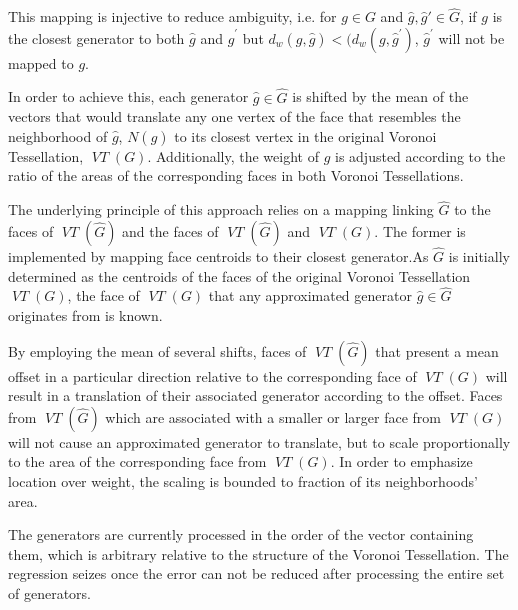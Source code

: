 \documentclass[a4paper]{article}
\DeclareMathOperator*{\VT}{\textit{VT}}
\begin{document}
This mapping is injective to reduce
ambiguity, i.e. for \(g \in G\) and \(\hat{g}, \hat{g}' \in \hat{G}\), if \(g\) is the closest generator to both
\(\hat{g}\) and \(\hat{g}^\prime\) but \(d_w(g, \hat{g}) < (d_w(g, \hat{g}^\prime)\), \(\hat{g}^\prime\) 
will not be mapped to \(g\).

In order to achieve this, each generator \(\hat{g} \in \hat{G}\) is shifted by the mean of the vectors that would translate
any one vertex of the face that resembles the neighborhood of \(\hat{g}\), \(N(\hat{g})\) to its closest vertex in
the original Voronoi Tessellation, \(\VT(G)\). Additionally, the weight of \(\hat{g}\) is adjusted according to the ratio of the
areas of the corresponding faces in both Voronoi Tessellations.

The underlying principle of this approach relies on a mapping linking \(\hat{G}\) to the faces of \(\VT(\hat{G})\) and
the faces of \(\VT(\hat{G})\) and \(\VT(G)\). The former is implemented by mapping face centroids to
their closest generator.As \(\hat{G}\) is initially determined as the centroids of the faces of the original
Voronoi Tessellation \(\VT(G)\), the face of \(\VT(G)\) that any approximated generator \(\hat{g} \in \hat{G}\) originates
from is known.

By employing the mean of several shifts, faces of \(\VT(\hat{G})\) that present a mean offset in a particular
direction relative to the corresponding face of \(\VT(G)\) will result in a translation of their associated
generator according to the offset. Faces from \(\VT({\hat{G}})\) which are associated with a smaller or larger
face from \(\VT(G)\) will not cause an approximated generator to translate, but to scale proportionally to the area
of the corresponding face from \(\VT(G)\). In order to emphasize location over weight, the scaling
is bounded to fraction of its neighborhoods' area.

The generators are currently processed in the order of the vector containing them,
which is arbitrary relative to the structure of the  Voronoi Tessellation. The regression seizes once the error can not
be reduced after processing the entire set of generators.
\end{document}
